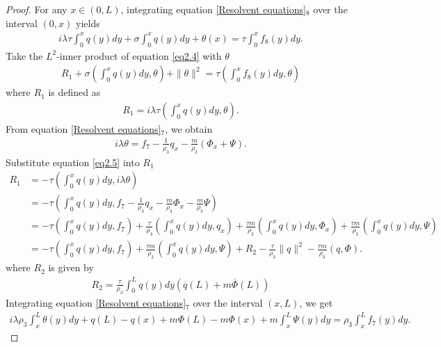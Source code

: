 \documentclass[11pt,reqno]{article}
\begin{document}
  \begin{proof}
  	For any $x \in (0,L)$, integrating equation \eqref{Resolvent equations}$_8$ over the interval $(0, x)$ yields
  	\begin{align}\label{eq2.4}
  		i \lambda \tau \int_{0}^{x} q(y)  dy + \sigma \int_{0}^{x} q(y) dy + \theta(x) = \tau \int_{0}^{x} f_8(y)  dy.
  	\end{align}
  	Take the $L^2$-inner product of equation \eqref{eq2.4} with $\theta$
  	\begin{align}\label{eq-theta}
  		R_1 + \sigma \left( \int_{0}^{x} q(y)  dy, \theta \right) + \|\theta\|^2 = \tau \left( \int_{0}^{x} f_8(y)  dy, \theta \right)
  	\end{align}
  	where $R_1$ is defined as
  	\begin{align*}
  		R_1 = i \lambda \tau \left( \int_{0}^{x} q(y)  dy, \theta \right).
  	\end{align*}
  	From equation \eqref{Resolvent equations}$_7$, we obtain
  	\begin{align}\label{eq2.5}
  		i\lambda \theta = f_7 - \frac{1}{\rho_3} q_x - \frac{m}{\rho_3}(\Phi_x + \Psi).
  	\end{align}
  	Substitute equation \eqref{eq2.5} into $R_1$
  	\begin{align*}
  		R_1 &= -\tau \left( \int_{0}^{x} q(y)  dy, i\lambda \theta \right) \\
  		&= -\tau \left( \int_{0}^{x} q(y)  dy,  f_7 - \frac{1}{\rho_3} q_x - \frac{m}{\rho_3} \Phi_x - \frac{m}{\rho_3} \Psi \right) \\
  		&= -\tau \left( \int_{0}^{x} q(y)  dy,  f_7 \right) + \frac{\tau}{\rho_3} \left( \int_{0}^{x} q(y)  dy,  q_x \right) + \frac{\tau m}{\rho_3} \left( \int_{0}^{x} q(y)  dy, \Phi_x \right) + \frac{\tau m}{\rho_3} \left( \int_{0}^{x} q(y)  dy,  \Psi \right)  \\
  		&= -\tau \left( \int_{0}^{x} q(y)  dy,  f_7 \right) + \frac{\tau m}{\rho_3} \left( \int_{0}^{x} q(y)  dy,  \Psi \right) + R_2 - \frac{\tau}{\rho_3} \|q\|^2 - \frac{\tau m}{\rho_3}(q,\Phi).
  	\end{align*}
  	where $R_2$ is given by
  	\begin{align*}
  		R_2=\frac{\tau}{\rho_3}  \int_{0}^{L} q(y)  dy  (\overline{q}(L) + m  \overline{\Phi}(L))
  	\end{align*}
  	Integrating equation \eqref{Resolvent equations}$_7$ over the interval $(x, L)$, we get
  	\begin{align}\label{eq2.6}
  		i\lambda\rho_3 \int_x^L \theta(y)  dy + q(L) - q(x) + m\Phi(L) - m\Phi(x) + m \int_x^L \Psi(y)  dy = \rho_3 \int_x^L f_7(y)  dy.

\end{align}
\end{proof}
\end{document}
